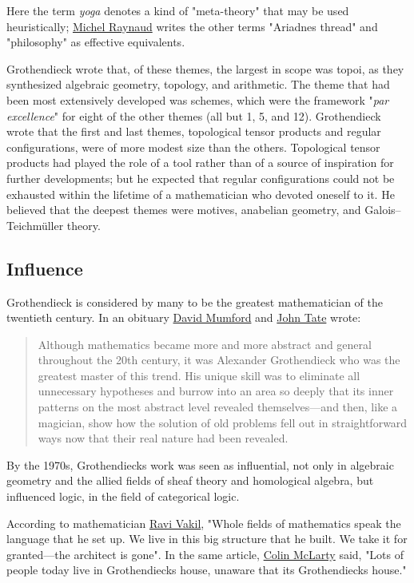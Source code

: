 Here the term \emph{yoga} denotes a kind of "meta-theory" that may be used heuristically; \href{https://en.wikipedia.org/wiki/Michel_Raynaud}{Michel Raynaud} writes the other terms "Ariadne\textquotesingle s thread" and "philosophy" as effective equivalents.

Grothendieck wrote that, of these themes, the largest in scope was topoi, as they synthesized algebraic geometry, topology, and arithmetic. The theme that had been most extensively developed was schemes, which were the framework "\emph{par excellence}" for eight of the other themes (all but 1, 5, and 12). Grothendieck wrote that the first and last themes, topological tensor products and regular configurations, were of more modest size than the others. Topological tensor products had played the role of a tool rather than of a source of inspiration for further developments; but he expected that regular configurations could not be exhausted within the lifetime of a mathematician who devoted oneself to it. He believed that the deepest themes were motives, anabelian geometry, and Galois--Teichmüller theory.


\subsection{Influence}\label{Influence}

Grothendieck is considered by many to be the greatest mathematician of the twentieth century. In an obituary \href{https://en.wikipedia.org/wiki/David_Mumford}{David Mumford} and \href{https://en.wikipedia.org/wiki/John_Tate_(mathematician)}{John Tate} wrote:

\begin{quote}
Although mathematics became more and more abstract and general throughout the 20th century, it was Alexander Grothendieck who was the greatest master of this trend. His unique skill was to eliminate all unnecessary hypotheses and burrow into an area so deeply that its inner patterns on the most abstract level revealed themselves---and then, like a magician, show how the solution of old problems fell out in straightforward ways now that their real nature had been revealed.
\end{quote}

By the 1970s, Grothendieck\textquotesingle s work was seen as influential, not only in algebraic geometry and the allied fields of sheaf theory and homological algebra, but influenced logic, in the field of categorical logic.

According to mathematician \href{https://en.wikipedia.org/wiki/Ravi_Vakil}{Ravi Vakil}, "Whole fields of mathematics speak the language that he set up. We live in this big structure that he built. We take it for granted---the architect is gone". In the same article, \href{https://en.wikipedia.org/wiki/Colin_McLarty}{Colin McLarty} said, "Lots of people today live in Grothendieck\textquotesingle s house, unaware that it\textquotesingle s Grothendieck\textquotesingle s house."


